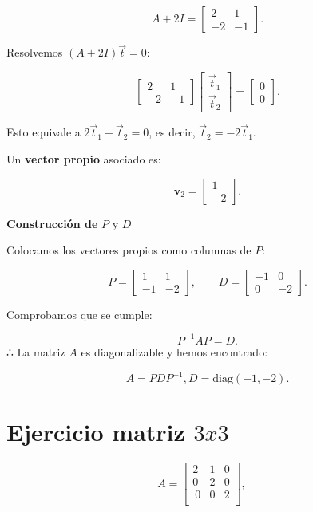 \documentclass[
  letterpaper,
  DIV=11,
  numbers=noendperiod]{scrreprt}
\begin{document}
\[
A + 2I = 
\begin{bmatrix}
2 & 1\\
-2 & -1
\end{bmatrix}.
\]

Resolvemos \((A + 2I)\vec{t} = 0\):

\[
\begin{bmatrix}
2 & 1\\
-2 & -1
\end{bmatrix}
\begin{bmatrix}
\vec{t}_1\\
\vec{t}_2
\end{bmatrix}
=
\begin{bmatrix}
0\\
0
\end{bmatrix}.
\]

Esto equivale a \(2\vec{t}_1 + \vec{t}_2 = 0\), es decir,
\(\vec{t}_2 = -2\vec{t}_1\).

Un \textbf{vector propio} asociado es:

\[
\mathbf{v}_2 =
\begin{bmatrix}
1\\
-2
\end{bmatrix}.
\]

\textbf{Construcción de} \(P\) y \(D\)

Colocamos los vectores propios como columnas de \(P\):

\[
P =
\begin{bmatrix}
1 & 1\\
-1 & -2
\end{bmatrix},
\qquad
D =
\begin{bmatrix}
-1 & 0\\
0 & -2
\end{bmatrix}.
\]

Comprobamos que se cumple:

\[
P^{-1}AP = D.
\] ∴ La matriz \(A\) es diagonalizable y hemos encontrado:

\[
A = P D P^{-1}, D = 
\text{diag}(-1, -2).
\]

\section{\texorpdfstring{Ejercicio matriz
\(3x3\)}{Ejercicio matriz 3x3}}\label{ejercicio-matriz-3x3}

\[
A=\begin{bmatrix}2 & 1 & 0\\[2pt] 0 & 2 & 0\\[2pt]\ 0 & 0 & 2\\[2pt]\end{bmatrix},\quad
\]
\end{document}
